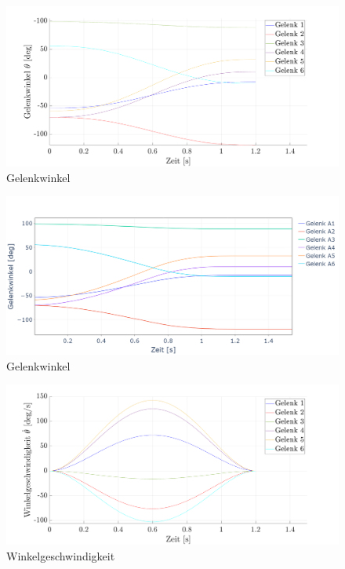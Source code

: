 %
\newpage
\begin{figure}[]
	\centering
	\includegraphics[width=1\linewidth]{images/gelenkwinkel}
	\caption{Gelenkwinkel}
	\label{fig:gelenkwinkel}
\end{figure}
%
\begin{figure}[]
	\centering
	\includegraphics[width=1\linewidth]{images/gelenkwinkel_py}
	\caption{Gelenkwinkel}
	\label{fig:gelenkwinkelpy}
\end{figure}
%
\newpage
\begin{figure}[]
	\centering
	\includegraphics[width=1\linewidth]{images/winkelgeschwindigkeit}
	\caption{Winkelgeschwindigkeit}
	\label{fig:winkelgeschwindigkeit}
\end{figure}
